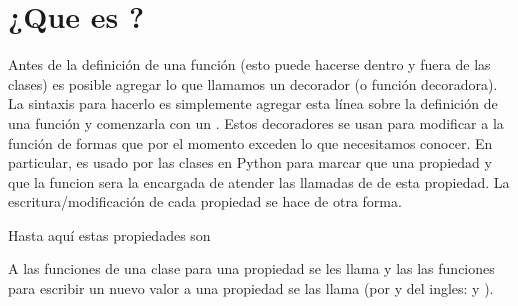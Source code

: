 \documentclass[a5paper,9pt,spanish]{sphinxmanual}
\begin{document}
\section{¿Que es ?}
\label{\detokenize{class-props:que-es-property}}
\sphinxAtStartPar
Antes de la definición de una función (esto puede hacerse dentro y fuera de las clases)
es posible agregar lo que llamamos un decorador (o función decoradora). La sintaxis para
hacerlo es simplemente agregar esta línea sobre la definición de una función y comenzarla
con un . Estos decoradores se usan para modificar a la función de
formas que por el momento exceden lo que necesitamos conocer.
En particular,  es usado por las clases en Python para marcar que una
propiedad  y que la funcion 
sera la encargada de atender las llamadas de  de esta propiedad.
La escritura/modificación de cada propiedad se hace de otra forma.

\sphinxAtStartPar
Hasta aquí estas propiedades son 

%
\begin{sphinxVerbatim}[commandchars=\\\{\},numbers=left,firstnumber=1,stepnumber=1]
   
  
\end{sphinxVerbatim}
\sphinxresetverbatimhllines

\sphinxAtStartPar
A las funciones de una clase para  una propiedad se les llama 
y las las funciones para escribir un nuevo valor a una propiedad se las llama
 (por  y  del ingles:  y ).
\end{document}
